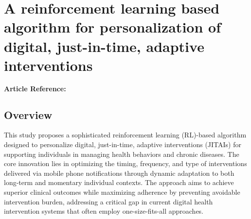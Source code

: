 \section{A reinforcement learning based algorithm for personalization of digital, just-in-time, adaptive interventions}
\textbf{Article Reference:} \cite{gonulReinforcementLearningBased2021} 

\subsection*{Overview}
This study proposes a sophisticated reinforcement learning (RL)-based algorithm designed to personalize digital, just-in-time, adaptive interventions (JITAIs) for supporting individuals in managing health behaviors and chronic diseases. The core innovation lies in optimizing the timing, frequency, and type of interventions delivered via mobile phone notifications through dynamic adaptation to both long-term and momentary individual contexts. The approach aims to achieve superior clinical outcomes while maximizing adherence by preventing avoidable intervention burden, addressing a critical gap in current digital health intervention systems that often employ one-size-fits-all approaches.

